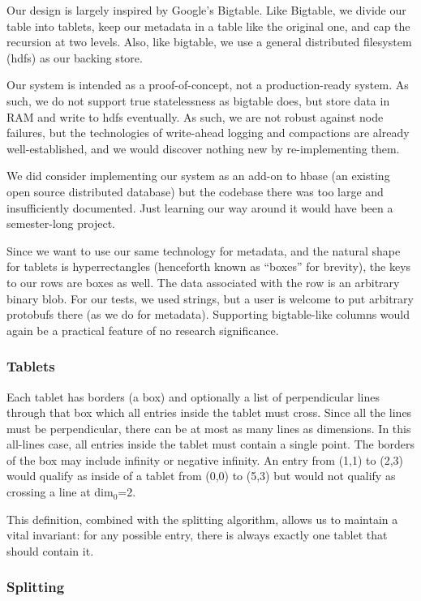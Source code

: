 \documentclass[11pt]{article}
\begin{document}
Our design is largely inspired by Google's Bigtable. Like Bigtable, we divide our table into tablets, keep our metadata in a table like the original one, and cap the recursion at two levels. Also, like bigtable, we use a general distributed filesystem (hdfs) as our backing store.

Our system is intended as a proof-of-concept, not a production-ready system. As such, we do not support true statelessness as bigtable does, but store data in RAM and write to hdfs eventually. As such, we are not robust against node failures, but the technologies of write-ahead logging and compactions are already well-established, and we would discover nothing new by re-implementing them.

We did consider implementing our system as an add-on to hbase (an existing open source distributed database) but the codebase there was too large and insufficiently documented. Just learning our way around it would have been a semester-long project.

Since we want to use our same technology for metadata, and the natural shape for tablets is hyperrectangles (henceforth known as ``boxes'' for brevity), the keys to our rows are boxes as well. The data associated with the row is an arbitrary binary blob. For our tests, we used strings, but a user is welcome to put arbitrary protobufs there (as we do for metadata). Supporting bigtable-like columns would again be a practical feature of no research significance.

\subsubsection{Tablets}

Each tablet has borders (a box) and optionally a list of perpendicular lines through that box which all entries inside the tablet must cross. Since all the lines must be perpendicular, there can be at most as many lines as dimensions. In this all-lines case, all entries inside the tablet must contain a single point. The borders of the box may include infinity or negative infinity. An entry from (1,1) to (2,3) would qualify as inside of a tablet from (0,0) to (5,3) but would not qualify as crossing a line at dim$_0$=2.

This definition, combined with the splitting algorithm, allows us to maintain a vital invariant: for any possible entry, there is always exactly one tablet that should contain it.

\subsubsection{Splitting}
\end{document}
